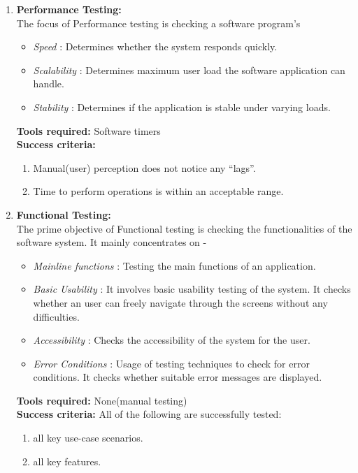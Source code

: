 \begin{enumerate}
\item \textbf{Performance Testing:} \\
The focus of Performance testing is checking a software program’s
\begin{itemize}
\item \emph{Speed} : Determines whether the system responds quickly.
\item \emph{Scalability} : Determines maximum user load the software application can handle.
\item \emph{Stability} : Determines if the application is stable under varying loads.
\end{itemize}
\textbf{Tools required:} Software timers \\
\textbf{Success criteria:} 
\begin{enumerate}
\item Manual(user) perception does not notice any ``lags''.
\item Time to perform operations is within an acceptable range.
\end{enumerate}


\item \textbf{Functional Testing:} \\
The prime objective of Functional testing is   checking the functionalities of the software system. It mainly concentrates on -
\begin{itemize}
\item \emph{Mainline functions} :  Testing the main functions of an application.
\item \emph{Basic Usability} : It involves basic usability testing of the system. It checks whether an user can freely navigate through the screens without any difficulties.
\item \emph{Accessibility} :  Checks the accessibility of the system for the user.
\item \emph{Error Conditions} : Usage of testing techniques to check for error conditions.  It checks whether suitable error messages are displayed.
\end{itemize}
\textbf{Tools required:} None(manual testing) \\
\textbf{Success criteria:} All of the following are successfully tested:
\begin{enumerate}
\item all key use-case scenarios.
\item all key features.
\end{enumerate}


\end{enumerate}
